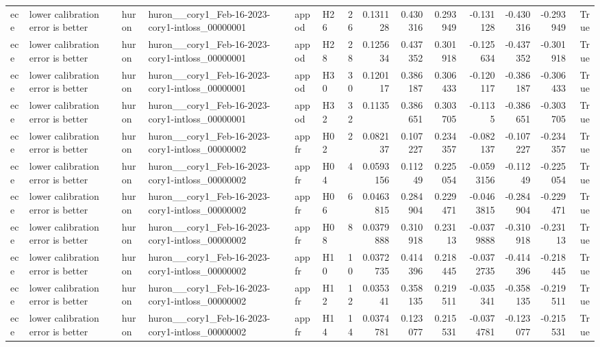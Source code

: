 \begin{longtable}{llllllrrrrrrrr}
ece & lower calibration error is better & huron & huron\_\_cory1\_Feb-16-2023-cory1-intloss\_00000001 & appod & H26 & 26 & 0.131128 & 0.430316 & 0.293949 & -0.131128 & -0.430316 & -0.293949 & True \\
ece & lower calibration error is better & huron & huron\_\_cory1\_Feb-16-2023-cory1-intloss\_00000001 & appod & H28 & 28 & 0.125634 & 0.437352 & 0.301918 & -0.125634 & -0.437352 & -0.301918 & True \\
ece & lower calibration error is better & huron & huron\_\_cory1\_Feb-16-2023-cory1-intloss\_00000001 & appod & H30 & 30 & 0.120117 & 0.386187 & 0.306433 & -0.120117 & -0.386187 & -0.306433 & True \\
ece & lower calibration error is better & huron & huron\_\_cory1\_Feb-16-2023-cory1-intloss\_00000001 & appod & H32 & 32 & 0.1135 & 0.386651 & 0.303705 & -0.1135 & -0.386651 & -0.303705 & True \\
ece & lower calibration error is better & huron & huron\_\_cory1\_Feb-16-2023-cory1-intloss\_00000002 & appfr & H02 & 2 & 0.082137 & 0.107227 & 0.234357 & -0.082137 & -0.107227 & -0.234357 & True \\
ece & lower calibration error is better & huron & huron\_\_cory1\_Feb-16-2023-cory1-intloss\_00000002 & appfr & H04 & 4 & 0.0593156 & 0.11249 & 0.225054 & -0.0593156 & -0.11249 & -0.225054 & True \\
ece & lower calibration error is better & huron & huron\_\_cory1\_Feb-16-2023-cory1-intloss\_00000002 & appfr & H06 & 6 & 0.0463815 & 0.284904 & 0.229471 & -0.0463815 & -0.284904 & -0.229471 & True \\
ece & lower calibration error is better & huron & huron\_\_cory1\_Feb-16-2023-cory1-intloss\_00000002 & appfr & H08 & 8 & 0.0379888 & 0.310918 & 0.23113 & -0.0379888 & -0.310918 & -0.23113 & True \\
ece & lower calibration error is better & huron & huron\_\_cory1\_Feb-16-2023-cory1-intloss\_00000002 & appfr & H10 & 10 & 0.0372735 & 0.414396 & 0.218445 & -0.0372735 & -0.414396 & -0.218445 & True \\
ece & lower calibration error is better & huron & huron\_\_cory1\_Feb-16-2023-cory1-intloss\_00000002 & appfr & H12 & 12 & 0.035341 & 0.358135 & 0.219511 & -0.035341 & -0.358135 & -0.219511 & True \\
ece & lower calibration error is better & huron & huron\_\_cory1\_Feb-16-2023-cory1-intloss\_00000002 & appfr & H14 & 14 & 0.0374781 & 0.123077 & 0.215531 & -0.0374781 & -0.123077 & -0.215531 & True \\

\end{longtable}

